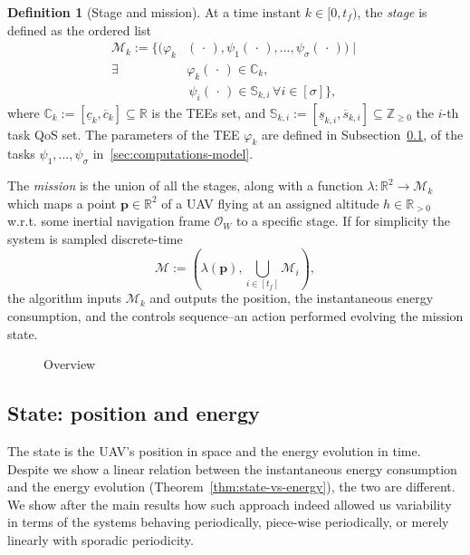 \documentclass[letterpaper,10pt,conference]{ieeeconf}
\newcommand{\figpath}{./figures}
\theoremstyle{definition}
\newtheorem{defn}{Definition}[section]
\begin{document}
\begin{defn}[Stage and mission]\label{def:mission}
  At a time instant $k\in[0,t_f)$, the \emph{stage} is defined as the ordered list
  \begin{equation}\label{eq:mission}\begin{split}
    \mathcal{M}_k:=\{(\varphi_k&(\,\cdot\,),\psi_1(\,\cdot\,),...,\psi_\sigma(\,\cdot\,))\mid\\\exists\,\,&\varphi_k(\,\cdot\,)\in\mathbb{C}_k,\,\\&\,\psi_i(\,\cdot\,)\in\mathbb{S}_{k,i}\,\forall i\in[\sigma]\},
  \end{split}\end{equation}
  where $\mathbb{C}_k:=[\underline{c}_k,\overline{c}_k]\subseteq\mathbb{R}$ is the TEEs set, and $\mathbb{S}_{k,i}:=[\underline{s}_{k,i},\overline{s}_{k,i}]\subseteq\mathbb{Z}_{\geq 0}$ the $i$-th task QoS set. The parameters of the TEE $\varphi_k$ are defined in Subsection~\ref{sec:model}, of the tasks $\psi_1,\dots,\psi_\sigma$ in~\ref{sec:computations-model}.

  The \emph{mission} is the union of all the stages, along with a function $\lambda:\mathbb{R}^2\rightarrow\mathcal{M}_k$ which maps a point $\mathbf{p}\in\mathbb{R}^2$ of a UAV flying at an assigned altitude $h\in\mathbb{R}_{>0}$ w.r.t. some inertial navigation frame $\mathcal{O}_W$ to a specific stage. If for simplicity the system is sampled discrete-time
  \begin{equation}
    \mathcal{M}:=(\lambda(\mathbf{p}),\bigcup_{i\in[t_f]}{\mathcal{M}_i}),
  \end{equation}
  the algorithm inputs $\mathcal{M}_k$ and outputs the position, the instantaneous energy consumption, and the controls sequence--an action performed evolving the mission state.
\end{defn}

\begin{figure}[t]
  \centering
  
  \caption{Overview}
  \label{fig:overview}
\end{figure}

\subsection{State: position and energy}
\label{sec:model}

The state is the UAV's position in space and the energy evolution in time. Despite we show a linear relation between the instantaneous energy consumption and the energy evolution (Theorem~\ref{thm:state-vs-energy}), the two are different. We show after the main results how such approach indeed allowed us variability in terms of the systems behaving periodically, piece-wise periodically, or merely linearly with sporadic periodicity.
\end{document}
